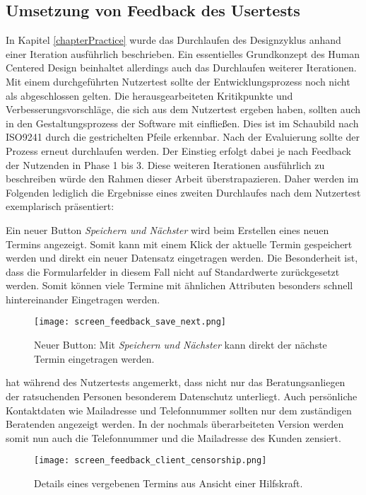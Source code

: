 \subsection*{Umsetzung von Feedback des Usertests}
\label{paragraph:weitereIteration}

In Kapitel \ref{chapterPractice} wurde das Durchlaufen des Designzyklus anhand
einer Iteration ausführlich beschrieben. Ein essentielles Grundkonzept des
Human Centered Design beinhaltet allerdings auch das Durchlaufen weiterer
Iterationen. Mit einem durchgeführten Nutzertest sollte der Entwicklungsprozess
noch nicht als abgeschlossen gelten. Die herausgearbeiteten Kritikpunkte und
Verbesserungsvorschläge, die sich aus dem Nutzertest ergeben haben, sollten
auch in den Gestaltungsprozess der Software mit einfließen. Dies ist im
Schaubild nach ISO9241 durch die gestrichelten Pfeile erkennbar. Nach der
Evaluierung sollte der Prozess erneut durchlaufen werden. Der Einstieg erfolgt
dabei je nach Feedback der Nutzenden in Phase 1 bis 3\cite{iso9241}. Diese
weiteren Iterationen ausführlich zu beschreiben würde den Rahmen dieser Arbeit
überstrapazieren. Daher werden im Folgenden lediglich die Ergebnisse eines
zweiten Durchlaufes nach dem Nutzertest exemplarisch präsentiert:

Ein neuer Button \textit{Speichern und Nächster} wird beim Erstellen eines
neuen Termins angezeigt. Somit kann mit einem Klick der aktuelle Termin
gespeichert werden und direkt ein neuer Datensatz eingetragen werden. Die
Besonderheit ist, dass die Formularfelder in diesem Fall nicht auf
Standardwerte zurückgesetzt werden. Somit können viele Termine mit ähnlichen
Attributen besonders schnell hintereinander Eingetragen werden.

\begin{figure}[H]
    \caption{Neuer Button: Mit \textit{Speichern und Nächster} kann direkt der nächste Termin eingetragen werden.}
    \centering
    \texttt{[image: screen\_feedback\_save\_next.png]}
\end{figure}

\ipName hat während des Nutzertests angemerkt, dass nicht nur das Beratungsanliegen der ratsuchenden Personen besonderem Datenschutz unterliegt. Auch persönliche Kontaktdaten wie Mailadresse und Telefonnummer sollten nur dem zuständigen Beratenden angezeigt werden. In der nochmals überarbeiteten Version werden somit nun auch die Telefonnummer und die Mailadresse des Kunden zensiert.

\begin{figure}[H]
    \caption{Details eines vergebenen Termins aus Ansicht einer Hilfskraft.}
    \centering
    \texttt{[image: screen\_feedback\_client\_censorship.png]}
\end{figure}

